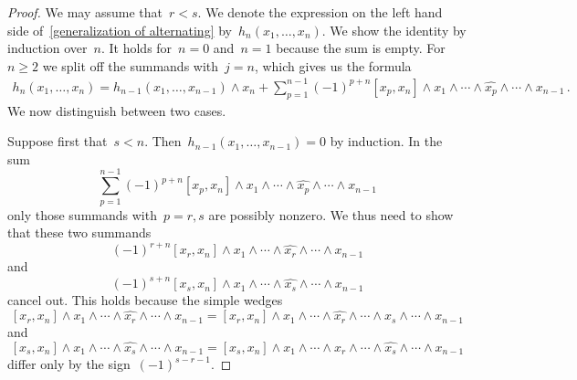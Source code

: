 \begin{proof}
	We may assume that~$r < s$.
	We denote the expression on the left hand side of~\eqref{generalization of alternating} by~$h_n(x_1, \dotsc, x_n)$.
	We show the identity by induction over~$n$.
	It holds for~$n = 0$ and~$n = 1$ because the sum is empty.
	For~$n \geq 2$ we split off the summands with~$j = n$, which gives us the formula
	\begin{align*}
		h_n(x_1, \dotsc, x_n)
		=
		h_{n-1}(x_1, \dotsc, x_{n-1}) \wedge x_n
		+
		\sum_{p=1}^{n-1}
		(-1)^{p+n}
		[x_p, x_n] \wedge x_1 \wedge \dotsb \wedge \widehat{x_p} \wedge \dotsb \wedge x_{n-1} \,.
	\end{align*}
	We now distinguish between two cases.

	Suppose first that~$s < n$.
	Then~$h_{n-1}(x_1, \dotsc, x_{n-1}) = 0$ by induction.
	In the sum
	\[
		\sum_{p=1}^{n-1}
		(-1)^{p+n}
		[x_p, x_n] \wedge x_1 \wedge \dotsb \wedge \widehat{x_p} \wedge \dotsb \wedge x_{n-1}
	\]
	only those summands with~$p = r, s$ are possibly nonzero.
	We thus need to show that these two summands
	\[
		(-1)^{r+n}
		[x_r, x_n] \wedge x_1 \wedge \dotsb \wedge \widehat{x_r} \wedge \dotsb \wedge x_{n-1}
	\]
	and
	\[
		(-1)^{s+n}
		[x_s, x_n] \wedge x_1 \wedge \dotsb \wedge \widehat{x_s} \wedge \dotsb \wedge x_{n-1}
	\]
	cancel out.
	This holds because the simple wedges
	\[
		[x_r, x_n] \wedge x_1 \wedge \dotsb \wedge \widehat{x_r} \wedge \dotsb \wedge x_{n-1}
		=
		[x_r, x_n] \wedge x_1 \wedge \dotsb \wedge \widehat{x_r} \wedge \dotsb \wedge x_s \wedge \dotsb \wedge x_{n-1}
	\]
	and
	\[
		[x_s, x_n] \wedge x_1 \wedge \dotsb \wedge \widehat{x_s} \wedge \dotsb \wedge x_{n-1}
		=
		[x_s, x_n] \wedge x_1 \wedge \dotsb \wedge x_r \wedge \dotsb \wedge \widehat{x_s} \wedge \dotsb \wedge x_{n-1}
	\]
	differ only by the sign~$(-1)^{s-r-1}$.


\end{proof}
